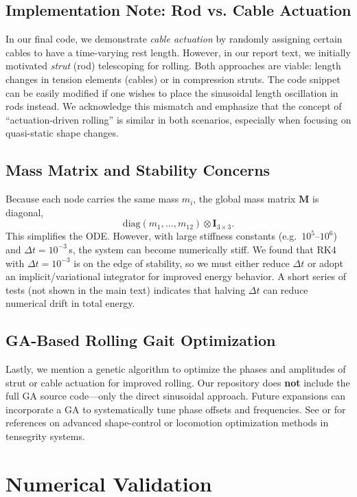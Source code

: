 \documentclass[12pt,letterpaper]{article}
\newcommand{\Mass}{\mathbf{M}}
\begin{document}
\subsection{Implementation Note: Rod vs. Cable Actuation}
In our final code, we demonstrate \emph{cable actuation} by randomly assigning certain cables to have a time-varying rest length. However, in our report text, we initially motivated \emph{strut} (rod) telescoping for rolling. Both approaches are viable: length changes in tension elements (cables) or in compression struts. The code snippet can be easily modified if one wishes to place the sinusoidal length oscillation in rods instead. We acknowledge this mismatch and emphasize that the concept of “actuation-driven rolling” is similar in both scenarios, especially when focusing on quasi-static shape changes.

\subsection{Mass Matrix and Stability Concerns}
Because each node carries the same mass $m_i$, the global mass matrix $\Mass$ is diagonal, $$\mathrm{diag}(m_1,\dots,m_{12}) \otimes \mathbf{I}_{3\times 3}.$$ This simplifies the ODE. However, with large stiffness constants (e.g.\ $10^5$--$10^6$) and $\Delta t=10^{-3}$\,s, the system can become numerically stiff. We found that RK4 with $\Delta t = 10^{-3}$ is on the edge of stability, so we must either reduce $\Delta t$ or adopt an implicit/variational integrator for improved energy behavior. A short series of tests (not shown in the main text) indicates that halving $\Delta t$ can reduce numerical drift in total energy.

\subsection{GA-Based Rolling Gait Optimization}
Lastly, we mention a genetic algorithm to optimize the phases and amplitudes of strut or cable actuation for improved rolling. Our repository does \textbf{not} include the full GA source code—only the direct sinusoidal approach. Future expansions can incorporate a GA to systematically tune phase offsets and frequencies. See \cite{ZhengCaiWang2020Rolling} or \cite{Cai2020} for references on advanced shape-control or locomotion optimization methods in tensegrity systems.

\section{Numerical Validation}
\end{document}
